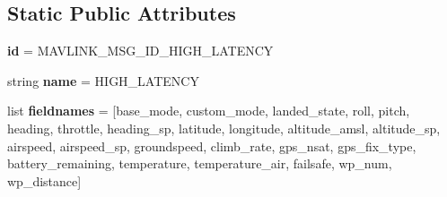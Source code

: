 \subsection*{Static Public Attributes}
\begin{DoxyCompactItemize}
\item 
\mbox{\label{classpymavlink_1_1dialects_1_1v10_1_1MAVLink__high__latency__message_a19b30d30d4d8726cd548d508ee6124df}} 
{\bfseries id} = M\+A\+V\+L\+I\+N\+K\+\_\+\+M\+S\+G\+\_\+\+I\+D\+\_\+\+H\+I\+G\+H\+\_\+\+L\+A\+T\+E\+N\+CY
\item 
\mbox{\label{classpymavlink_1_1dialects_1_1v10_1_1MAVLink__high__latency__message_a5bd6832e4ad525b6e396b4023a964661}} 
string {\bfseries name} = \textquotesingle{}H\+I\+G\+H\+\_\+\+L\+A\+T\+E\+N\+CY\textquotesingle{}
\item 
\mbox{\label{classpymavlink_1_1dialects_1_1v10_1_1MAVLink__high__latency__message_a81a626e979dfd0c6803cf238aa56b303}} 
list {\bfseries fieldnames} = \mbox{[}\textquotesingle{}base\+\_\+mode\textquotesingle{}, \textquotesingle{}custom\+\_\+mode\textquotesingle{}, \textquotesingle{}landed\+\_\+state\textquotesingle{}, \textquotesingle{}roll\textquotesingle{}, \textquotesingle{}pitch\textquotesingle{}, \textquotesingle{}heading\textquotesingle{}, \textquotesingle{}throttle\textquotesingle{}, \textquotesingle{}heading\+\_\+sp\textquotesingle{}, \textquotesingle{}latitude\textquotesingle{}, \textquotesingle{}longitude\textquotesingle{}, \textquotesingle{}altitude\+\_\+amsl\textquotesingle{}, \textquotesingle{}altitude\+\_\+sp\textquotesingle{}, \textquotesingle{}airspeed\textquotesingle{}, \textquotesingle{}airspeed\+\_\+sp\textquotesingle{}, \textquotesingle{}groundspeed\textquotesingle{}, \textquotesingle{}climb\+\_\+rate\textquotesingle{}, \textquotesingle{}gps\+\_\+nsat\textquotesingle{}, \textquotesingle{}gps\+\_\+fix\+\_\+type\textquotesingle{}, \textquotesingle{}battery\+\_\+remaining\textquotesingle{}, \textquotesingle{}temperature\textquotesingle{}, \textquotesingle{}temperature\+\_\+air\textquotesingle{}, \textquotesingle{}failsafe\textquotesingle{}, \textquotesingle{}wp\+\_\+num\textquotesingle{}, \textquotesingle{}wp\+\_\+distance\textquotesingle{}\mbox{]}
\item 

\end{DoxyCompactItemize}
